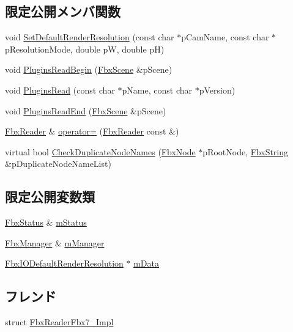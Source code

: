 \subsection*{限定公開メンバ関数}
\begin{DoxyCompactItemize}
\item 
void \hyperlink{class_fbx_reader_a57209dd75b739a6234bd21212f447215}{Set\+Default\+Render\+Resolution} (const char $\ast$p\+Cam\+Name, const char $\ast$p\+Resolution\+Mode, double pW, double pH)
\item 
void \hyperlink{class_fbx_reader_a55e4e6db14fdee2454bb590551310b03}{Plugins\+Read\+Begin} (\hyperlink{class_fbx_scene}{Fbx\+Scene} \&p\+Scene)
\item 
void \hyperlink{class_fbx_reader_a72e6537a9823550e485243aa67a48bbd}{Plugins\+Read} (const char $\ast$p\+Name, const char $\ast$p\+Version)
\item 
void \hyperlink{class_fbx_reader_ab0213250ebf3b09c6f31ee1d2a610a07}{Plugins\+Read\+End} (\hyperlink{class_fbx_scene}{Fbx\+Scene} \&p\+Scene)
\item 
\hyperlink{class_fbx_reader}{Fbx\+Reader} \& \hyperlink{class_fbx_reader_ab5a00e2bf3c80f5167a89149b96df57c}{operator=} (\hyperlink{class_fbx_reader}{Fbx\+Reader} const \&)
\item 
virtual bool \hyperlink{class_fbx_reader_ac9093c41782a1b48331f1ab54ee4617d}{Check\+Duplicate\+Node\+Names} (\hyperlink{class_fbx_node}{Fbx\+Node} $\ast$p\+Root\+Node, \hyperlink{class_fbx_string}{Fbx\+String} \&p\+Duplicate\+Node\+Name\+List)
\end{DoxyCompactItemize}
\subsection*{限定公開変数類}
\begin{DoxyCompactItemize}
\item 
\hyperlink{class_fbx_status}{Fbx\+Status} \& \hyperlink{class_fbx_reader_a8a9bd15f63e9b7ab1ad155608d4db1e0}{m\+Status}
\item 
\hyperlink{class_fbx_manager}{Fbx\+Manager} \& \hyperlink{class_fbx_reader_a572c9e4dc988f01da8ffb6e16ef4cca2}{m\+Manager}
\item 
\hyperlink{class_fbx_i_o_default_render_resolution}{Fbx\+I\+O\+Default\+Render\+Resolution} $\ast$ \hyperlink{class_fbx_reader_adf13af19c89bdeffde6fdf2e2ebdf7ac}{m\+Data}
\end{DoxyCompactItemize}
\subsection*{フレンド}
\begin{DoxyCompactItemize}
\item 
struct \hyperlink{class_fbx_reader_a825b5c450dc04c4042a16fa36d3641c3}{Fbx\+Reader\+Fbx7\+\_\+\+Impl}
\end{DoxyCompactItemize}


